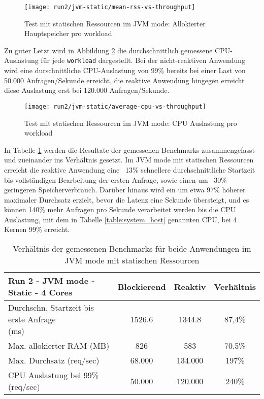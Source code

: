 \begin{figure}[ht!]
    \centering
    \texttt{[image: run2/jvm-static/mean-rss-vs-throughput]}
    \caption{Test mit statischen Ressourcen im JVM mode: Allokierter Hauptspeicher pro workload}
    \label{fig:jvm_static_mean_rss}
\end{figure}
\newpage
Zu guter Letzt wird in Abbildung \ref{fig:jvm_static_avg_cpu} die durchschnittlich gemessene CPU-Auslastung für jede \verb|workload| dargestellt.
Bei der nicht-reaktiven Anwendung wird eine durschnittliche CPU-Auslastung von 99\% bereits bei einer Last von 50.000 Anfragen/Sekunde erreicht, die reaktive Anwendung hingegen erreicht diese Auslastung erst bei 120.000 Anfragen/Sekunde.
\begin{figure}[ht!]
    \centering
    \texttt{[image: run2/jvm-static/average-cpu-vs-throughput]}
    \caption{Test mit statischen Ressourcen im JVM mode: CPU Auslastung pro workload}
    \label{fig:jvm_static_avg_cpu}
\end{figure}

In Tabelle \ref{table:static_jvm_measurement_results} werden die Resultate der gemessenen Benchmarks zusammengefasst
und zueinander ins Verhältnis gesetzt. Im JVM mode mit statischen Ressourcen erreicht die reaktive Anwendung
eine ~13\% schnellere durchschnittliche Startzeit bis vollständigen Bearbeitung der ersten Anfrage, sowie
einen um ~30\% geringeren Speicherverbrauch.
Darüber hinaus wird ein um etwa 97\% höherer maximaler Durchsatz erzielt, bevor die Latenz eine Sekunde übersteigt, und
es können 140\% mehr Anfragen pro Sekunde verarbeitet werden bis die CPU Auslastung, mit dem in Tabelle \ref{table:system_host}
genannten CPU, bei 4 Kernen 99\% erreicht.

\begin{table}[ht!]
    \begin{tabular}{|l | c | c | c|}
        \hline
        Run 2 - JVM mode - Static - 4 Cores & Blockierend & Reaktiv & Verhältnis \\
        \hline
        \makecell{Durchschn. Startzeit bis erste Anfrage                         \\(ms)} & 1526.6      & 1344.8  & 87,4\%     \\
        \hline
        Max. allokierter RAM (MB)           & 826         & 583     & 70.5\%     \\
        \hline
        Max. Durchsatz (req/sec)            & 68.000      & 134.000 & 197\%      \\
        \hline
        CPU Auslastung bei 99\% (req/sec)   & 50.000      & 120.000 & 240\%      \\
        \hline
    \end{tabular}
    \caption{Verhältnis der gemessenen Benchmarks für beide Anwendungen im JVM mode mit statischen Ressourcen}
    \label{table:static_jvm_measurement_results}
\end{table}

